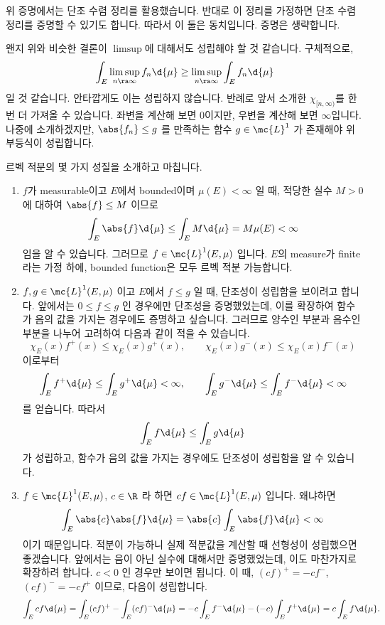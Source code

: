 \rmk 위 증명에서는 단조 수렴 정리를 활용했습니다. 반대로 이 정리를 가정하면 단조 수렴 정리를 증명할 수 있기도 합니다. 따라서 이 둘은 동치입니다. 증명은 생략합니다.

\rmk 왠지 위와 비슷한 결론이 \(\limsup\)에 대해서도 성립해야 할 것 같습니다. 구체적으로,
\[
    \int_E \limsup_{n \ra \infty} f_n \d{\mu} \geq \limsup_{n \ra \infty} \int_E f_n \d{\mu}
\]
일 것 같습니다. 안타깝게도 이는 성립하지 않습니다. 반례로 앞서 소개한 \(\chi_{[n, \infty)}\)를 한 번 더 가져올 수 있습니다. 좌변을 계산해 보면 0이지만, 우변을 계산해 보면 \(\infty\)입니다. 나중에 소개하겠지만, \(\abs{f_n} \leq g\) 를 만족하는 함수 \(g \in \mc{L}^{1}\) 가 존재해야 위 부등식이 성립합니다.

\rmk 르벡 적분의 몇 가지 성질을 소개하고 마칩니다.
\begin{enumerate}
    \item \(f\)가 measurable이고 \(E\)에서 bounded이며 \(\mu(E) < \infty\) 일 때, 적당한 실수 \(M > 0\) 에 대하여 \(\abs{f} \leq M\) 이므로
          \[
              \int_E \abs{f} \d{\mu} \leq \int_E M \d{\mu} = M\mu(E) < \infty
          \]
          임을 알 수 있습니다. 그러므로 \(f \in \mc{L}^{1}(E, \mu)\) 입니다. \(E\)의 measure가 finite라는 가정 하에, bounded function은 모두 르벡 적분 가능합니다.

    \item \(f, g \in \mc{L}^{1}(E, \mu)\) 이고 \(E\)에서 \(f \leq g\) 일 때, 단조성이 성립함을 보이려고 합니다. 앞에서는 \(0 \leq f \leq g\) 인 경우에만 단조성을 증명했었는데, 이를 확장하여 함수가 음의 값을 가지는 경우에도 증명하고 싶습니다. 그러므로 양수인 부분과 음수인 부분을 나누어 고려하여 다음과 같이 적을 수 있습니다.
          \[
              \chi_E (x) f^+(x) \leq \chi_E(x) g^+(x), \qquad \chi_E(x) g^-(x) \leq \chi_E (x) f^-(x)
          \]
          이로부터
          \[
              \int_E f^+ \d{\mu} \leq \int_E g^+ \d{\mu} < \infty, \qquad \int_E g^- \d{\mu} \leq \int_E f^- \d{\mu} < \infty
          \]
          를 얻습니다. 따라서
          \[
              \int_E f\d{\mu} \leq \int_E g \d{\mu}
          \]
          가 성립하고, 함수가 음의 값을 가지는 경우에도 단조성이 성립함을 알 수 있습니다.

    \item \(f \in \mc{L}^{1}(E, \mu)\), \(c \in \R\) 라 하면 \(cf \in \mc{L}^{1}(E, \mu)\) 입니다. 왜냐하면
          \[
              \int_E \abs{c}\abs{f} \d{\mu} = \abs{c} \int_E \abs{f}\d{\mu} < \infty
          \]
          이기 때문입니다. 적분이 가능하니 실제 적분값을 계산할 때 선형성이 성립했으면 좋겠습니다. 앞에서는 음이 아닌 실수에 대해서만 증명했었는데, 이도 마찬가지로 확장하려 합니다. \(c < 0\) 인 경우만 보이면 됩니다. 이 때, \((cf)^+ = -cf^-\), \((cf)^- = -cf^+\) 이므로, 다음이 성립합니다.
          \[
              \int_E cf \d{\mu} = \int_E (cf)^+ - \int_E (cf)^- \d{\mu} = -c \int_E f^- \d{\mu} - (-c) \int_E f^+ \d{\mu} = c\int_E f\d{\mu}.
          \]


\end{enumerate}
